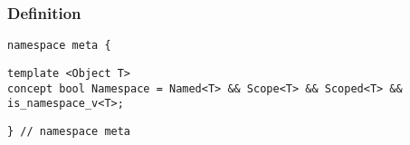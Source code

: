 
\subsubsection{Definition}

\begin{verbatim}
namespace meta {
\end{verbatim}
\begin{verbatim}
template <Object T>
concept bool Namespace = Named<T> && Scope<T> && Scoped<T> && is_namespace_v<T>;

\end{verbatim}
\begin{verbatim}
} // namespace meta
\end{verbatim}
